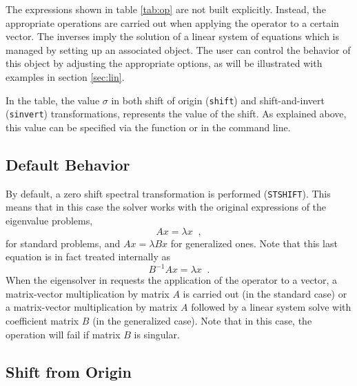 	The expressions shown in table \ref{tab:op} are not built explicitly. Instead, the appropriate operations are carried out when applying the operator to a certain vector. The inverses imply the solution of a linear system of equations which is managed by setting up an associated  object. The user can control the behavior of this object by adjusting the appropriate options, as will be illustrated with examples in section \ref{sec:lin}.

	In the table, the value $\sigma$ in both shift of origin (\texttt{shift}) and shift-and-invert (\texttt{sinvert}) transformations, represents the value of the shift. As explained above, this value can be specified via the  function or in the command line.

\subsection{Default Behavior}

	By default, a zero shift spectral transformation is performed (\texttt{STSHIFT}). This means that in this case the solver works with the original expressions of the eigenvalue problems,
\begin{equation}Ax=\lambda x\;\;,\end{equation}
for standard problems, and $Ax=\lambda Bx$ for generalized ones. Note that this last equation is in fact treated internally as
\begin{equation}B^{-1}Ax=\lambda x\;\;.\end{equation}
When the eigensolver in  requests the application of the operator to a vector, a matrix-vector multiplication by matrix $A$ is carried out (in the standard case) or a matrix-vector multiplication by matrix $A$ followed by a linear system solve with coefficient matrix $B$ (in the generalized case). Note that in this case, the operation will fail if matrix $B$ is singular.

\subsection{Shift from Origin}

